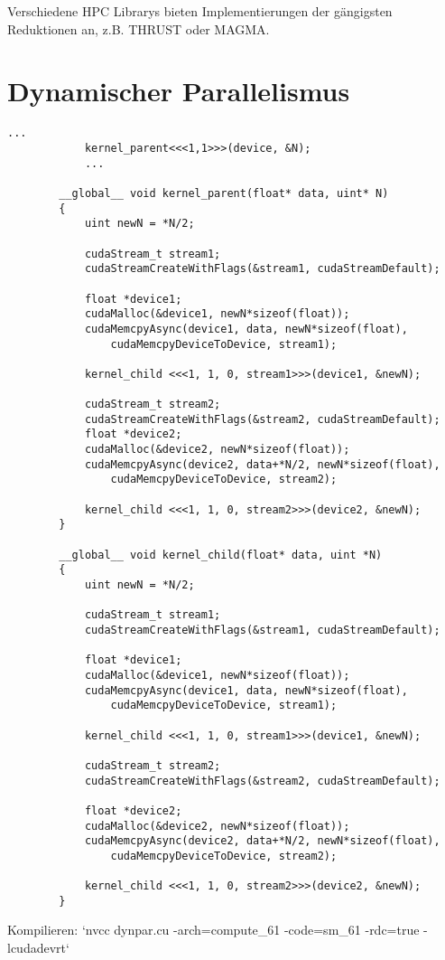 		Verschiedene HPC Librarys bieten Implementierungen der gängigsten Reduktionen an, z.B. THRUST oder MAGMA. 
		
		\section{Dynamischer Parallelismus}\label{dyn}
		\begin{lstlisting}[caption=Dynamischer Parallelismus]
			...
  			kernel_parent<<<1,1>>>(device, &N);
			...
			
		__global__ void kernel_parent(float* data, uint* N)
		{
  			uint newN = *N/2;
  
			cudaStream_t stream1; 
			cudaStreamCreateWithFlags(&stream1, cudaStreamDefault);
  
			float *device1;
			cudaMalloc(&device1, newN*sizeof(float));
			cudaMemcpyAsync(device1, data, newN*sizeof(float), 
				cudaMemcpyDeviceToDevice, stream1);
  
			kernel_child <<<1, 1, 0, stream1>>>(device1, &newN);
  
			cudaStream_t stream2; 
			cudaStreamCreateWithFlags(&stream2, cudaStreamDefault);
			float *device2;
			cudaMalloc(&device2, newN*sizeof(float));
			cudaMemcpyAsync(device2, data+*N/2, newN*sizeof(float), 
				cudaMemcpyDeviceToDevice, stream2);
  
			kernel_child <<<1, 1, 0, stream2>>>(device2, &newN);
		}

		__global__ void kernel_child(float* data, uint *N)
		{
			uint newN = *N/2;
  
			cudaStream_t stream1; 
			cudaStreamCreateWithFlags(&stream1, cudaStreamDefault);
			
			float *device1;
			cudaMalloc(&device1, newN*sizeof(float));
			cudaMemcpyAsync(device1, data, newN*sizeof(float), 
				cudaMemcpyDeviceToDevice, stream1);
  
			kernel_child <<<1, 1, 0, stream1>>>(device1, &newN);
  
			cudaStream_t stream2; 
			cudaStreamCreateWithFlags(&stream2, cudaStreamDefault);
			
			float *device2;
			cudaMalloc(&device2, newN*sizeof(float));
			cudaMemcpyAsync(device2, data+*N/2, newN*sizeof(float), 
				cudaMemcpyDeviceToDevice, stream2);
  
			kernel_child <<<1, 1, 0, stream2>>>(device2, &newN);
		}
		\end{lstlisting}
		
		Kompilieren: \li`nvcc dynpar.cu -arch=compute_61 -code=sm_61 -rdc=true -lcudadevrt`
		
